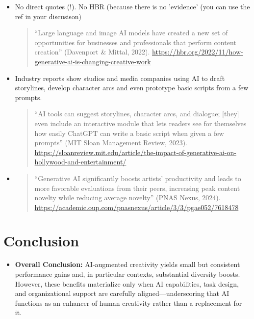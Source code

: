 \documentclass[acmsmall,authorversion]{acmart}
\begin{document}
\begin{itemize}
        \item No direct quotes (!). No HBR (because there is no 'evidence' (you can use the ref in your discusison)\begin{quote}
          “Large language and image AI models have created a new set of opportunities for businesses and professionals that perform content creation” (Davenport \& Mittal, 2022). \url{https://hbr.org/2022/11/how-generative-ai-is-changing-creative-work}
        \end{quote}
        \item Industry reports show studios and media companies using AI to draft storylines, develop character arcs and even prototype basic scripts from a few prompts.  
        \begin{quote}
          “AI tools can suggest storylines, character arcs, and dialogue; [they] even include an interactive module that lets readers see for themselves how easily ChatGPT can write a basic script when given a few prompts” (MIT Sloan Management Review, 2023).  \url{https://sloanreview.mit.edu/article/the-impact-of-generative-ai-on-hollywood-and-entertainment/} 
        \end{quote}
        \item \begin{quote}
          “Generative AI significantly boosts artists’ productivity and leads to more favorable evaluations from their peers, increasing peak content novelty while reducing average novelty” (PNAS Nexus, 2024).  \url{https://academic.oup.com/pnasnexus/article/3/3/pgae052/7618478}
        \end{quote}
    \end{itemize}
\section{Conclusion}
\label{sec:Conclusion}

\begin{itemize}
  \item \textbf{Overall Conclusion:} AI‐augmented creativity yields small but consistent performance gains and, in particular contexts, substantial diversity boosts. However, these benefits materialize only when AI capabilities, task design, and organizational support are carefully aligned—underscoring that AI functions as an enhancer of human creativity rather than a replacement for it.
\end{itemize}
\newpage


\newpage
\appendix
\end{document}

